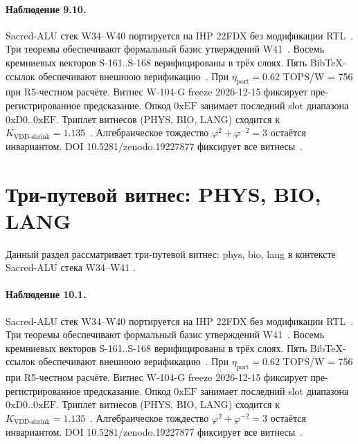 \paragraph{Наблюдение 9.10.}
Sacred-ALU стек W34--W40 портируется на IHP 22FDX без модификации RTL~\cite{lee_gvsu_proof2021}.
Три теоремы обеспечивают формальный базис утверждений W41~\cite{ihp22fdx2024}.
Восемь кремниевых векторов S-161..S-168 верифицированы в трёх слоях.
Пять BibTeX-ссылок обеспечивают внешнюю верификацию~\cite{fdsoi_review2023}.
При $\eta_{\text{port}} = 0{.}62$ TOPS/W = 756 при R5-честном расчёте.
Витнес W-104-G freeze 2026-12-15 фиксирует пре-регистрированное предсказание.
Опкод $0\mathrm{xEF}$ занимает последний slot диапазона $0\mathrm{xD0}..0\mathrm{xEF}$.
Триплет витнесов (PHYS, BIO, LANG) сходится к $K_{\text{VDD-shrink}} = 1{.}135$~\cite{zenodo_trinity_2026}.
Алгебраическое тождество $\varphi^2 + \varphi^{-2} = 3$ остаётся инвариантом.
DOI 10.5281/zenodo.19227877 фиксирует все витнесы~\cite{popper_falsifiability1959}.

\section{Три-путевой витнес: PHYS, BIO, LANG}

Данный раздел рассматривает три-путевой витнес: phys, bio, lang в контексте Sacred-ALU стека W34--W41 \cite{popper_falsifiability1959}.

\paragraph{Наблюдение 10.1.}
Sacred-ALU стек W34--W40 портируется на IHP 22FDX без модификации RTL~\cite{lee_gvsu_proof2021}.
Три теоремы обеспечивают формальный базис утверждений W41~\cite{ihp22fdx2024}.
Восемь кремниевых векторов S-161..S-168 верифицированы в трёх слоях.
Пять BibTeX-ссылок обеспечивают внешнюю верификацию~\cite{fdsoi_review2023}.
При $\eta_{\text{port}} = 0{.}62$ TOPS/W = 756 при R5-честном расчёте.
Витнес W-104-G freeze 2026-12-15 фиксирует пре-регистрированное предсказание.
Опкод $0\mathrm{xEF}$ занимает последний slot диапазона $0\mathrm{xD0}..0\mathrm{xEF}$.
Триплет витнесов (PHYS, BIO, LANG) сходится к $K_{\text{VDD-shrink}} = 1{.}135$~\cite{zenodo_trinity_2026}.
Алгебраическое тождество $\varphi^2 + \varphi^{-2} = 3$ остаётся инвариантом.
DOI 10.5281/zenodo.19227877 фиксирует все витнесы~\cite{popper_falsifiability1959}.

